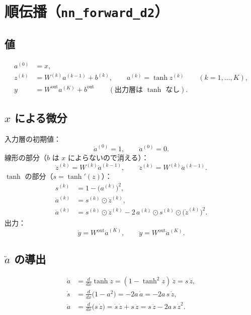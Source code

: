 \documentclass[a4paper,11pt]{ltjsarticle}
\newcommand{\Wout}{W^{\mathrm{out}}}
\newcommand{\bout}{b^{\mathrm{out}}}
\newcommand{\code}[1]{\texttt{#1}}
\begin{document}
\section{順伝播（\code{nn\_forward\_d2}）}

\subsection{値}
\begin{align}
  a^{(0)} &= x, \\
  z^{(k)} &= W^{(k)}a^{(k-1)}+b^{(k)},\qquad a^{(k)}=\tanh z^{(k)}\qquad(k=1,\dots,K), \\
  y &= \Wout a^{(K)}+\bout \qquad(\text{出力層は }\tanh\text{ なし}).
\end{align}

\subsection{$x$ による微分}
入力層の初期値：
\begin{equation}
  \dot a^{(0)}=1,\qquad \ddot a^{(0)}=0.
\end{equation}
線形の部分（$b$ は $x$ によらないので消える）：
\begin{equation}
  \dot z^{(k)}=W^{(k)}\dot a^{(k-1)},\qquad \ddot z^{(k)}=W^{(k)}\ddot a^{(k-1)}.
\end{equation}
$\tanh$ の部分（$s=\tanh'(z)$）：
\begin{align}
  s^{(k)} &= 1-\bigl(a^{(k)}\bigr)^2, \\
  \dot a^{(k)} &= s^{(k)}\odot\dot z^{(k)}, \\
  \ddot a^{(k)} &= s^{(k)}\odot\ddot z^{(k)}-2\,a^{(k)}\odot s^{(k)}\odot\bigl(\dot z^{(k)}\bigr)^2.
\end{align}
出力：
\begin{equation}
  \dot y=\Wout\dot a^{(K)},\qquad \ddot y=\Wout\ddot a^{(K)}.
\end{equation}

\subsection{$\ddot a$ の導出}
\begin{align}
  \dot a &= \frac{d}{dx}\tanh z=(1-\tanh^2 z)\,\dot z=s\,\dot z, \\
  \dot s &= \frac{d}{dx}\bigl(1-a^2\bigr)=-2a\,\dot a=-2a\,s\,\dot z, \\
  \ddot a &= \frac{d}{dx}\bigl(s\,\dot z\bigr)=\dot s\,\dot z+s\,\ddot z=s\,\ddot z-2a\,s\,\dot z^2.
\end{align}
\end{document}
